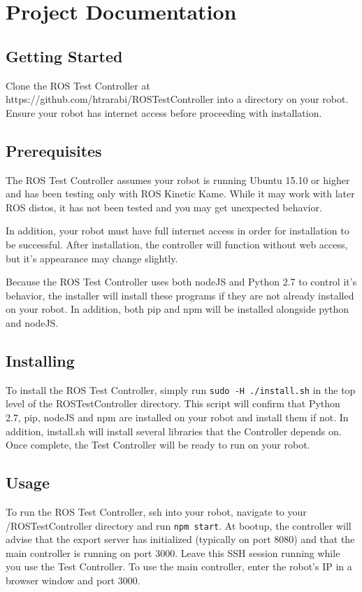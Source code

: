 \documentclass[onecolumn, draftclsnofoot,10pt, compsoc]{report}
\begin{document}
\chapter{Project Documentation}

\minitoc
\section{Getting Started}


Clone the ROS Test Controller at https://github.com/htrarabi/ROSTestController into a directory on your robot. Ensure your robot has internet access before proceeding with installation.

\section{Prerequisites}

The ROS Test Controller assumes your robot is running Ubuntu 15.10 or higher and has been testing only with ROS Kinetic Kame. While it may work with later ROS distos, it has not been tested and you may get unexpected behavior.

In addition, your robot must have full internet access in order for installation to be successful. After installation, the controller will function without web access, but it's appearance may change slightly.

Because the ROS Test Controller uses both nodeJS and Python 2.7 to control it's behavior, the installer will install these programs if they are not already installed on your robot. In addition, both pip and npm will be installed alongside python and nodeJS.
\section{Installing}

To install the ROS Test Controller, simply run \texttt{sudo -H ./install.sh} in the top level of the ROSTestController directory. This script will confirm that Python 2.7, pip, nodeJS and npm are installed on your robot and install them if not. In addition, install.sh will install several libraries that the Controller depends on. Once complete, the Test Controller will be ready to run on your robot.
\section{Usage}

To run the ROS Test Controller, ssh into your robot, navigate to your /ROSTestController directory and run \texttt{npm start}. At bootup, the controller will advise that the export server has initialized (typically on port 8080) and that the main controller is running on port 3000. Leave this SSH session running while you use the Test Controller. To use the main controller, enter the robot's IP in a browser window and port 3000.
\end{document}

